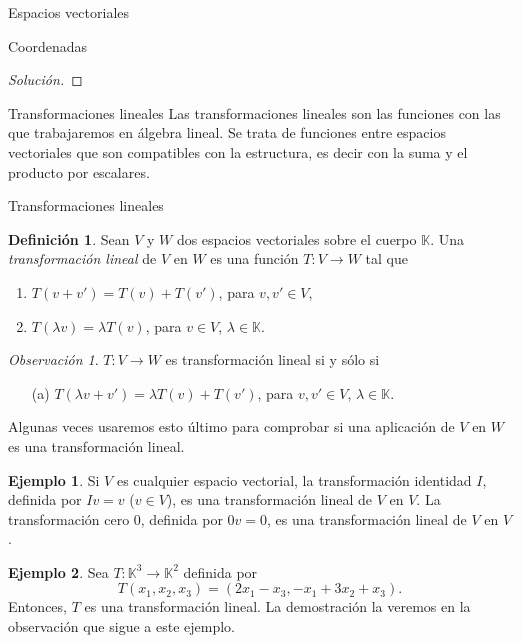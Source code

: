 \documentclass[a4paper,12pt,twoside,spanish]{amsbook}
\theoremstyle{definition}
\newtheorem{definicion}{Definici\'on}[section]
\newtheorem{ejemplo}{Ejemplo}[section]
\theoremstyle{remark}
\newtheorem{obs}{Observaci\'on}[section]
\newcommand{\K}{\mathbb K}
\begin{document}
\begin{chapter}{Espacios vectoriales}
\begin{section}{Coordenadas}
\begin{proof}[Solución]
	  
\end{proof}
	
	\end{section}

	\end{chapter}
	
		
	\begin{chapter}{Transformaciones lineales}\label{chap-trans-lin}
		Las transformaciones lineales son las funciones con las que trabajaremos en álgebra lineal. Se trata de funciones entre espacios vectoriales que son compatibles con la estructura,  es decir con la suma y el producto por escalares.
		
		
		\begin{section}{Transformaciones lineales}
			\begin{definicion}
				Sean $V$ y $W$ dos espacios vectoriales sobre el cuerpo $\K$. Una 				\textit{transformación lineal} de $V$ en $W$ es una función $T:V \to W$  tal que
				\begin{enumerate}
					\item $T(v+v') = T(v)+ T(v')$, para $v,v' \in V$,
					\item $T(\lambda v) = \lambda T(v)$, para $v \in V$, $\lambda \in \K$.
				\end{enumerate}
			\end{definicion}
		
			\begin{obs}
				$T:V \to W$ es transformación lineal si y sólo si
				\begin{enumerate}
					\item[({a})]  $T(\lambda v+v') = \lambda T(v)+ T(v')$, para $v,v' \in V$, $\lambda \in \K$.
				\end{enumerate}
			Algunas veces usaremos esto último para comprobar si una aplicación de $V$ en $W$ es una transformación lineal. 
			\end{obs}
			
			\begin{ejemplo}
				Si $V$ es cualquier espacio vectorial, la transformación identidad $I$, definida por $Iv = v$ ($v \in V$), es una transformación lineal de $V$ en $V$. La transformación cero $0$, definida por $0v = 0$, es una transformación lineal de $V$ en $V$.
			\end{ejemplo}
		
			\begin{ejemplo}\label{ejemplo-lineal-3}
				Sea $T : \K^3 \to \K^2$ definida por
				$$
				T(x_1,x_2,x_3) = (2x_1 - x_3, -x_1+3x_2+x_3).
				$$
				Entonces, $T$  es una transformación lineal. La demostración la veremos en la observación que sigue a este ejemplo. 
				

\end{ejemplo}
\end{section}
\end{chapter}
\end{document}

